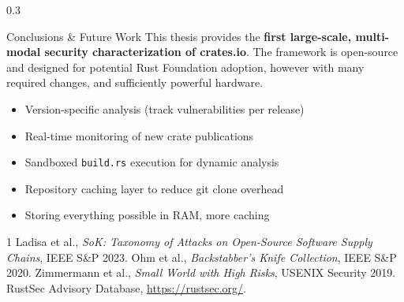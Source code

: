 \documentclass[final]{beamer}
\begin{document}
\begin{frame}[fragile]
\begin{columns}[t]
\begin{column}{0.3\paperwidth}
\begin{block}{Conclusions \& Future Work}
    This thesis provides the \textbf{first large-scale, multi-modal security
    characterization of crates.io}. The framework is open-source and designed
    for potential Rust Foundation adoption, however with many required changes, and sufficiently powerful hardware.
    \begin{itemize}
        \item Version-specific analysis (track vulnerabilities per release)
        \item Real-time monitoring of new crate publications
        \item Sandboxed \texttt{build.rs} execution for dynamic analysis
        \item Repository caching layer to reduce git clone overhead
        \item Storing everything possible in RAM, more caching
    \end{itemize}

    \bigskip
    \begin{thebibliography}{1}
         Ladisa et al., \textit{SoK: Taxonomy of Attacks on Open-Source Software Supply Chains}, IEEE S\&P 2023.
         Ohm et al., \textit{Backstabber's Knife Collection}, IEEE S\&P 2020.
         Zimmermann et al., \textit{Small World with High Risks}, USENIX Security 2019.
         RustSec Advisory Database, \url{https://rustsec.org/}.
    \end{thebibliography}
\end{block}

\end{column}

\separatorcolumn

\end{columns}
\end{frame}
\end{document}
